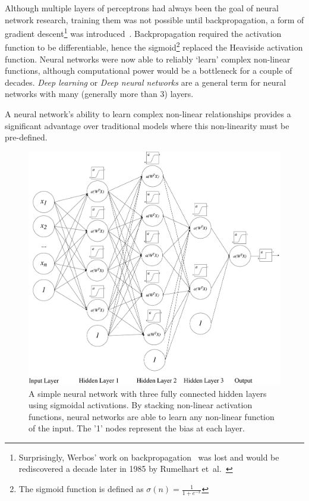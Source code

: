 \documentclass[12pt, twoside]{book}
\begin{document}
Although multiple layers of perceptrons had always been the goal of neural network research, training them was not possible until backpropagation, a form of gradient descent\footnote{Surprisingly, Werbos' work on backpropagation~\cite{werbos1974beyond}  was lost and would be rediscovered a decade later in 1985 by Rumelhart et~al.~\cite{backproprediscover}} was introduced~\cite{werbos1974beyond}. Backpropagation required the activation function to be differentiable, hence the sigmoid\footnote{The sigmoid function is defined as $\sigma(n) = \frac{1}{1+e^{-x}}$}  replaced the Heaviside activation function. Neural networks were now able to reliably `learn' complex non-linear functions, although computational power would be a bottleneck for a couple of decades. \textit{Deep learning} or \textit{Deep neural networks} are a general term for neural networks with many (generally more than 3) layers.


\begin{highlight}
A neural network's ability to learn complex non-linear relationships provides a significant advantage over traditional models where this non-linearity must be pre-defined.
\end{highlight}

\begin{figure}[h]
\label{nnetstacked}
\centering\includegraphics[width=1\linewidth]{neuralnet.pdf}
\caption{A simple neural network with three fully connected hidden layers using sigmoidal activations. By stacking non-linear activation functions, neural networks are able to learn any non-linear function of the input. The '1' nodes represent the bias at each layer.}
\end{figure}
\end{document}
